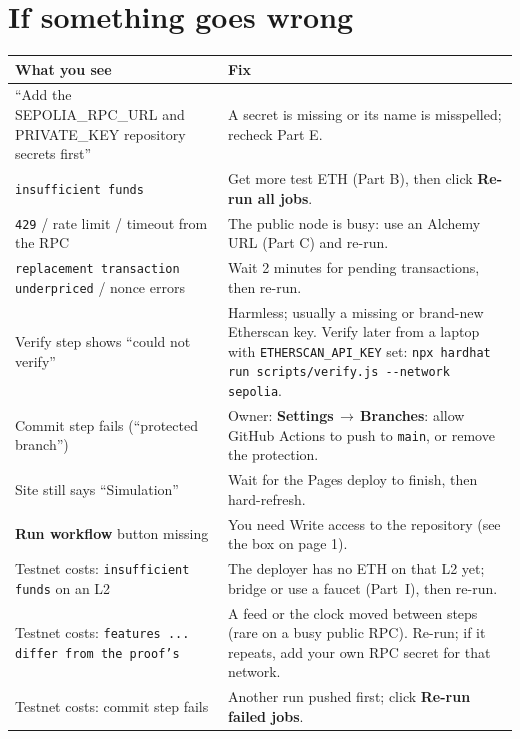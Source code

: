 \documentclass[11pt,a4paper]{article}
\newcommand{\ui}[1]{\textsf{\textbf{#1}}}
\newcommand{\code}[1]{\texttt{#1}}
\newcommand{\arr}{\,$\rightarrow$\,}
\begin{document}
\section{If something goes wrong}
\begin{center}
\renewcommand{\arraystretch}{1.25}
\begin{tabularx}{\textwidth}{@{}>{\raggedright\arraybackslash}p{6.2cm}X@{}}
\toprule
\textbf{What you see} & \textbf{Fix} \\
\midrule
``Add the SEPOLIA\_RPC\_URL and PRIVATE\_KEY repository secrets first'' & A secret is missing or its name is misspelled; recheck Part E. \\
\code{insufficient funds} & Get more test ETH (Part B), then click \ui{Re-run all jobs}. \\
\code{429} / rate limit / timeout from the RPC & The public node is busy: use an Alchemy URL (Part C) and re-run. \\
\code{replacement transaction underpriced} / nonce errors & Wait 2 minutes for pending transactions, then re-run. \\
Verify step shows ``could not verify'' & Harmless; usually a missing or brand-new Etherscan key. Verify later from a laptop with \code{ETHERSCAN\_API\_KEY} set: \texttt{npx hardhat run scripts/verify.js -{}-network sepolia}. \\
Commit step fails (``protected branch'') & Owner: \ui{Settings}\arr\ui{Branches}: allow GitHub Actions to push to \code{main}, or remove the protection. \\
Site still says ``Simulation'' & Wait for the Pages deploy to finish, then hard-refresh. \\
\ui{Run workflow} button missing & You need Write access to the repository (see the box on page 1). \\
Testnet costs: \code{insufficient funds} on an L2 & The deployer has no ETH on that L2 yet; bridge or use a faucet (Part~I), then re-run. \\
Testnet costs: \code{features ... differ from the proof's} & A feed or the clock moved between steps (rare on a busy public RPC). Re-run; if it repeats, add your own RPC secret for that network. \\
Testnet costs: commit step fails & Another run pushed first; click \ui{Re-run failed jobs}. \\
\bottomrule
\end{tabularx}
\end{center}
\end{document}
